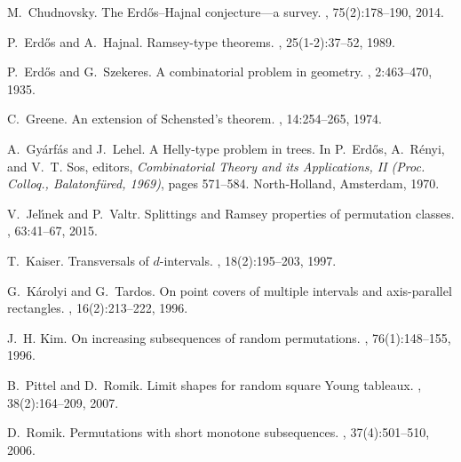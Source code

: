 \documentclass[
final
, nomarks
]{dmtcs-episciences}
\begin{document}
%
%
%
%
\def\cprime{$'$}
\begin{thebibliography}{10}

M.~Chudnovsky.
\newblock The {E}rd{\H{o}}s--{H}ajnal conjecture---a survey.
, 75(2):178--190, 2014.

P.~Erd{\H{o}}s and A.~Hajnal.
\newblock Ramsey-type theorems.
, 25(1-2):37--52, 1989.

P.~Erd{\H{o}}s and G.~Szekeres.
\newblock A combinatorial problem in geometry.
, 2:463--470, 1935.

C.~Greene.
\newblock An extension of {S}chensted's theorem.
, 14:254--265, 1974.

A.~Gy{\'a}rf{\'a}s and J.~Lehel.
\newblock A {H}elly-type problem in trees.
\newblock In P.~Erd{\H{o}}s, A.~R{\'e}nyi, and V.~T. Sos, editors, {\em
  Combinatorial Theory and its Applications, {II} ({P}roc. {C}olloq.,
  {B}alatonf\"ured, 1969)}, pages 571--584. North-Holland, Amsterdam, 1970.

V.~Jel{\'{\i}}nek and P.~Valtr.
\newblock Splittings and {R}amsey properties of permutation classes.
, 63:41--67, 2015.

T.~Kaiser.
\newblock Transversals of {$d$}-intervals.
, 18(2):195--203, 1997.

G.~K{\'a}rolyi and G.~Tardos.
\newblock On point covers of multiple intervals and axis-parallel rectangles.
, 16(2):213--222, 1996.

J.~H. Kim.
\newblock On increasing subsequences of random permutations.
, 76(1):148--155, 1996.

B.~Pittel and D.~Romik.
\newblock Limit shapes for random square {Y}oung tableaux.
, 38(2):164--209, 2007.

D.~Romik.
\newblock Permutations with short monotone subsequences.
, 37(4):501--510, 2006.


\end{thebibliography}
\end{document}
